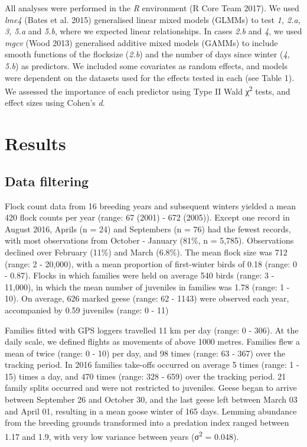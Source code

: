 \documentclass[10pt,twocolumn]{paper}
\begin{document}
All analyses were performed in the \emph{R} environment (R Core Team
2017). We used \emph{lme4} (Bates et al. 2015) generalised linear mixed
models (GLMMs) to test \emph{1, 2.a, 3, 5.a} and \emph{5.b}, where we
expected linear relationships. In cases \emph{2.b} and \emph{4}, we used
\emph{mgcv} (Wood 2013) generalised additive mixed models (GAMMs) to
include smooth functions of the flocksize (\emph{2.b}) and the number of
days since winter (\emph{4, 5.b}) as predictors. We included some
covariates as random effects, and models were dependent on the datasets
used for the effects tested in each (see Table 1). We assessed the
importance of each predictor using Type II Wald χ\textsuperscript{2}
tests, and effect sizes using Cohen's \emph{d}.

\section{Results}\label{results}

\subsection{Data filtering}\label{data-filtering}

Flock count data from 16 breeding years and subsequent winters yielded a
mean 420 flock counts per year (range: 67 (2001) - 672 (2005)). Except
one record in August 2016, Aprils (n = 24) and Septembers (n = 76) had
the fewest records, with most observations from October - January (81\%,
n = 5,785). Observations declined over February (11\%) and March
(6.8\%). The mean flock size was 712 (range: 2 - 20,000), with a mean
proportion of first-winter birds of 0.18 (range: 0 - 0.87). Flocks in
which families were held on average 540 birds (range: 3 - 11,000), in
which the mean number of juveniles in families was 1.78 (range: 1 - 10).
On average, 626 marked geese (range: 62 - 1143) were observed each year,
accompanied by 0.59 juveniles (range: 0 - 11)

Families fitted with GPS loggers travelled 11 km per day (range: 0 -
306). At the daily scale, we defined flights as movements of above 1000
metres. Families flew a mean of twice (range: 0 - 10) per day, and 98
times (range: 63 - 367) over the tracking period. In 2016 families
take-offs occurred on average 5 times (range: 1 - 15) times a day, and
470 times (range: 328 - 659) over the tracking period. 21 family splits
occurred and were not restricted to juveniles. Geese began to arrive
between September 26 and October 30, and the last geese left between
March 03 and April 01, resulting in a mean goose winter of 165 days.
Lemming abundance from the breeding grounds transformed into a predation
index ranged between 1.17 and 1.9, with very low variance between years
(σ\textsuperscript{2} = 0.048).
\end{document}
